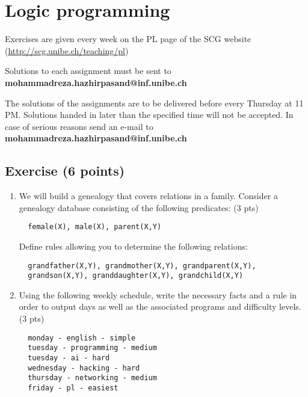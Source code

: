 \documentclass [11pt, a4wide, twoside]{article}
\begin{document}
\section*{\space{} Logic programming}


\begin{myitemize}
\item Exercises are given every week on the PL page of the SCG website \\ (\url{http://scg.unibe.ch/teaching/pl})
\item Solutions to each assignment must be sent to \textbf{mohammadreza.hazhirpasand@inf.unibe.ch}
\item The solutions of the assignments are to be delivered before every Thursday at 11 PM. Solutions handed in later than the specified time will not be accepted. In case of serious reasons send an e-mail to  \textbf{mohammadreza.hazhirpasand@inf.unibe.ch}
\end{myitemize}


\subsection*{Exercise (6 points)}


\begin{enumerate}
\item We will build a genealogy that covers relations in a family. Consider a genealogy database consisting of the following predicates: (3 pts)
%
\begin{verbatim}
  female(X), male(X), parent(X,Y)
\end{verbatim}
%
\noindent Define rules allowing you to determine the following relations:
%
\begin{verbatim}
  grandfather(X,Y), grandmother(X,Y), grandparent(X,Y),
  grandson(X,Y), granddaughter(X,Y), grandchild(X,Y)
\end{verbatim}

\vspace{0.5cm}

\solution{}



\item Using the following weekly schedule, write the necessary facts and a rule in order to output days as well as the associated programs and difficulty levels. (3 pts)

\begin{verbatim}
  monday - english - simple
  tuesday - programming - medium
  tuesday - ai - hard
  wednesday - hacking - hard
  thursday - networking - medium
  friday - pl - easiest 
\end{verbatim}

\vspace{0.5cm}

\solution{}

\end{enumerate}
\end{document}
